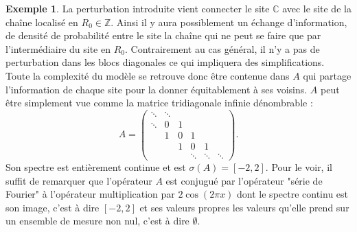 \documentclass[12pt,openany,a4paper, titlepage]{article}
\newcommand{\C}{\mathbb{C}}
\newcommand{\Z}{\mathbb{Z}}
\theoremstyle{definition}
\theoremstyle{definition}
\theoremstyle{definition}
\newtheorem{ex}{Exemple}
\theoremstyle{definition}
\theoremstyle{definition}
\theoremstyle{definition}
\begin{document}
\begin{ex}
La perturbation introduite vient connecter le site $\C$ avec le site de la chaîne localisé en $R_0\in\Z$. Ainsi il y aura possiblement un échange d'information, de densité de probabilité entre le site la chaîne qui ne peut se faire que par l'intermédiaire du site en $R_0$. Contrairement au cas général, il n'y a pas de perturbation dans les blocs diagonales ce qui impliquera des simplifications. 
Toute la complexité du modèle se retrouve donc être contenue dans $A$ qui partage l'information de chaque site pour la donner équitablement à ses voisins. $A$ peut être simplement vue comme la matrice tridiagonale infinie dénombrable :
\begin{equation}
   A = \begin{pmatrix}
\ddots & \ddots   \\
 \ddots & 0 & 1  \\
   & 1 & 0 & 1  \\
   &  & 1 & 0&  1& \\
   &  &   & \ddots & \ddots& \ddots 
\end{pmatrix}.
\end{equation}
Son spectre est entièrement continue et est $\sigma(A) = [-2,2]$. Pour le voir, il suffit de remarquer que l'opérateur $A$ est conjugué par l'opérateur "série de Fourier" à l'opérateur multiplication par $2\cos(2\pi x)$ dont le spectre continu est son image, c'est à dire $[-2,2]$ et ses valeurs propres les valeurs qu'elle prend sur un ensemble de mesure non nul, c'est à dire $\emptyset$.



\begin{figure}[h]
\centering
\begin{tikzpicture}[x=0.75pt,y=0.75pt,yscale=-1,xscale=1]


\end{tikzpicture}
\end{figure}
\end{ex}
\end{document}
